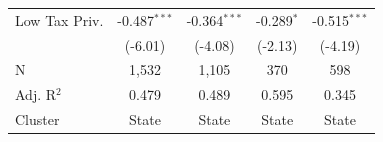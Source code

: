 \begin{tabular*}{\textwidth}{@{\extracolsep{\fill}}lcccc}
   Low Tax Priv.               & -0.487$^{***}$         & -0.364$^{***}$                & -0.289$^{*}$                  & -0.515$^{***}$\\   
                               & (-6.01)               & (-4.08)                      & (-2.13)                      & (-4.19)\\   
   \hline
   N                & 1,532                  & 1,105                         & 370                           & 598\\  
   Adj. R$^2$              & 0.479                  & 0.489                         & 0.595                         & 0.345\\  
   Cluster              & State & State & State & State\\  
   \bottomrule
\end{tabular*}
\par\endgroup
